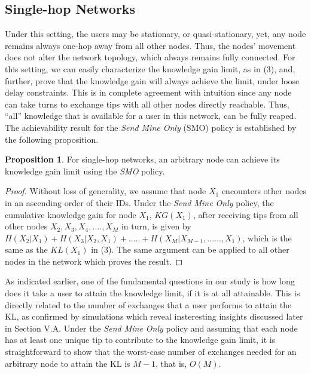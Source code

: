 \documentclass[conference]{IEEEtran}
\theoremstyle{definition}
\newtheorem{prop}{Proposition}
\begin{document}
\vspace{-0.2 cm}
\subsection{Single-hop Networks}
Under this setting, the users may be stationary, or quasi-stationary, yet, any
node remains always one-hop away from all other nodes. Thus, the nodes' movement does not alter the network topology, which always remains fully connected. 
For this setting, we can easily characterize the knowledge gain limit, as in (3), and, further, prove that the knowledge gain will always achieve the limit, under loose delay constraints. This is in complete agreement with intuition since any node can take turns to exchange tips with all other nodes directly reachable. Thus, ``all'' knowledge that is available for a user in this network, can be fully reaped. 
The achievability result for the {\it Send Mine Only} (SMO) policy is established by the following proposition.


\begin{prop}
For single-hop networks, an arbitrary node can achieve its knowledge gain limit using the {\it SMO} policy.
\end{prop}
\vspace{-0.1 cm}
\begin{proof}
Without loss of generality, we assume that node $X_1$ encounters other nodes in an ascending order of their IDs. Under the {\it Send Mine Only} policy, 
the cumulative knowledge gain for node $X_1$, $KG(X_1)$, after receiving tips from all other nodes $X_2, X_3, X_4,...., X_M$ in turn, is given by $H(X_2|X_1) + H(X_3|X_2,X_1) + .....+ H(X_M|X_{M-1}, ......, X_1)$, which is the same as the $KL(X_1)$ in (3). 
The same argument can be applied to all other nodes in the network which proves the result.
\end{proof}



As indicated earlier, one of the fundamental questions in our study is how long does it take a user to attain the knowledge limit, if it is at all attainable. This is directly related to the number of exchanges that a user performs to attain the KL, as confirmed by simulations which reveal insteresting insights discussed later in Section V.A. Under the {\it Send Mine Only} policy and assuming that each node has at least one unique tip to contribute to the knowledge gain limit, it is straightforward to show that the worst-case number of exchanges needed for an arbitrary node to attain the KL is $M-1$, that is, $O(M)$.
\end{document}
